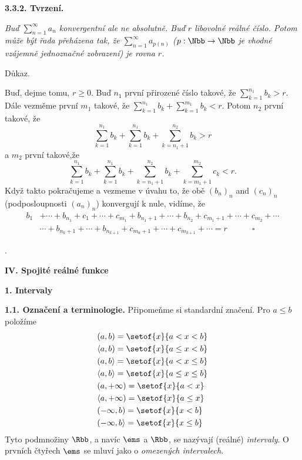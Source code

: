 \documentclass[12pt]{article}
\begin{document}
{ \medskip
 
 {\bf 3.3.2. Tvrzení.} {\em Buď $\sum_{n=1}^\infty a_n$ konvergentní ale ne absolutně. Buď  $r$ libovolné reálné číslo. Potom může být řada přeházena tak, že $\sum_{n=1}^\infty a_{p(n)}$ ($p:\Nbb\to\Nbb$ je vhodné vzájemně jednoznačné zobrazení) je rovna $r$.
 
 Důkaz.} Buď, dejme tomu,  $r\geq 0$. Buď $n_1$ první přirozené číslo takové, že
 $\sum_{k=1}^{n_1}b_k > r$. Dále vezměme první $m_1$ takové, že
 $\sum_{k=1}^{n_1}b_k +\sum_{k=1}^{m_1}b_k <r$. Potom $n_2$ první takové, že
 $$
 \sum_{k=1}^{n_1}b_k +\sum_{k=1}^{n_1}b_k +\sum_{k=n_1+1}^{n_2}b_k >r
 $$
  a $m_2$ první takové,že
 $$
 \sum_{k=1}^{n_1}b_k +\sum_{k=1}^{n_1}b_k +\sum_{k=n_1+1}^{n_2}b_k +
 \sum_{k=m_1+1}^{m_2}c_k<r.
 $$
 Když takto pokračujeme a vezmeme v úvahu to, že obě $(b_n)_n$ and $(c_n)_n$ (podposloupnosti $(a_n)_n$)
konvergují k nule, vidíme, že
$$
 \begin{aligned}
 b_1&+\cdots+b_{n_1}+c_1+\cdots+c_{m_1}+b_{n_1+1}+\cdots+b_{n_2}+c_{m_1+1}+\cdots+
 c_{m_2}+\cdots\\
 &\cdots+b_{n_k+1}+\cdots+b_{n_{k+1}}+c_{m_k+1}+\cdots+
 c_{m_{k+1}}+\cdots =r     \quad\quad\quad\square
 \end{aligned}
 $$
 

\newpage
. 
 
 
 \newpage
 
 \centerline{\Large\bf IV. Spojité reálné funkce} 
 
 \vskip10mm
 
 {\large\bf 1. Intervaly}
 
 \bigskip
 
 {\bf 1.1. Označení a terminologie.} Připomeňme si standardní značení. Pro $a\leq b$ položíme
 $$
 \begin{aligned} 
 &(a,b)=\setof{x}{a<x<b}\\
 &\langle a,b)=\setof{x}{a\leq x<b}\\
 &(a,b\rangle=\setof{x}{a<x\leq b}\\
 &\langle a,b\rangle=\setof{x}{a\leq x\leq b}\\
 &(a,+\infty)=\setof{x}{a< x}\\
 &\langle a,+\infty)=\setof{x}{a\leq x}\\
 &(-\infty,b)=\setof{x}{x<b}\\
  &(-\infty,b\rangle=\setof{x}{x\leq b}
 \end{aligned}
 $$
 Tyto podmnožiny $\Rbb$, a navíc $\ems$ a $\Rbb$, se nazývají (reálné) {\em intervaly}. O prvních čtyřech $\ems$ se mluví jako o {\em omezených intervalech}.
 
}
\end{document}
